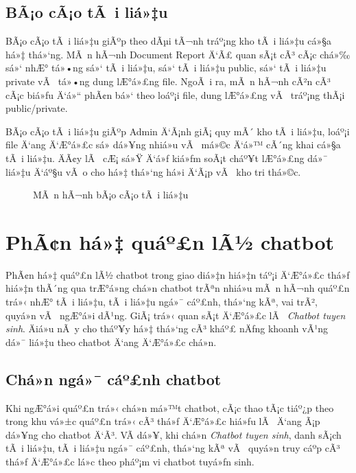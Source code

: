 ﻿\documentclass[12pt,a4paper]{report}
\begin{document}
\subsection{BÃ¡o cÃ¡o tÃ i liá»‡u}

BÃ¡o cÃ¡o tÃ i liá»‡u giÃºp theo dÃµi tÃ¬nh tráº¡ng kho tÃ i liá»‡u cá»§a há»‡ thá»‘ng. MÃ n hÃ¬nh Document Report Ä‘Ã£ quan sÃ¡t cÃ³ cÃ¡c chá»‰ sá»‘ nhÆ° tá»•ng sá»‘ tÃ i liá»‡u, sá»‘ tÃ i liá»‡u public, sá»‘ tÃ i liá»‡u private vÃ  tá»•ng dung lÆ°á»£ng file. NgoÃ i ra, mÃ n hÃ¬nh cÃ²n cÃ³ cÃ¡c biá»ƒu Ä‘á»“ phÃ¢n bá»‘ theo loáº¡i file, dung lÆ°á»£ng vÃ  tráº¡ng thÃ¡i public/private.

BÃ¡o cÃ¡o tÃ i liá»‡u giÃºp Admin Ä‘Ã¡nh giÃ¡ quy mÃ´ kho tÃ i liá»‡u, loáº¡i file Ä‘ang Ä‘Æ°á»£c sá»­ dá»¥ng nhiá»u vÃ  má»©c Ä‘á»™ cÃ´ng khai cá»§a tÃ i liá»‡u. ÄÃ¢y lÃ  cÆ¡ sá»Ÿ Ä‘á»ƒ kiá»ƒm soÃ¡t cháº¥t lÆ°á»£ng dá»¯ liá»‡u Ä‘áº§u vÃ o cho há»‡ thá»‘ng há»i Ä‘Ã¡p vÃ  kho tri thá»©c.

\begin{figure}[H]
    \centering
    \caption{MÃ n hÃ¬nh bÃ¡o cÃ¡o tÃ i liá»‡u}
    \label{fig:statistics-document-report}
\end{figure}

\section{PhÃ¢n há»‡ quáº£n lÃ½ chatbot}

PhÃ¢n há»‡ quáº£n lÃ½ chatbot trong giao diá»‡n hiá»‡n táº¡i Ä‘Æ°á»£c thá»ƒ hiá»‡n thÃ´ng qua trÆ°á»ng chá»n chatbot trÃªn nhiá»u mÃ n hÃ¬nh quáº£n trá»‹ nhÆ° tÃ i liá»‡u, tÃ i liá»‡u ngá»¯ cáº£nh, thá»‘ng kÃª, vai trÃ², quyá»n vÃ  ngÆ°á»i dÃ¹ng. GiÃ¡ trá»‹ quan sÃ¡t Ä‘Æ°á»£c lÃ  \textit{Chatbot tuyen sinh}. Äiá»u nÃ y cho tháº¥y há»‡ thá»‘ng cÃ³ kháº£ nÄƒng khoanh vÃ¹ng dá»¯ liá»‡u theo chatbot Ä‘ang Ä‘Æ°á»£c chá»n.

\subsection{Chá»n ngá»¯ cáº£nh chatbot}

Khi ngÆ°á»i quáº£n trá»‹ chá»n má»™t chatbot, cÃ¡c thao tÃ¡c tiáº¿p theo trong khu vá»±c quáº£n trá»‹ cÃ³ thá»ƒ Ä‘Æ°á»£c hiá»ƒu lÃ  Ä‘ang Ã¡p dá»¥ng cho chatbot Ä‘Ã³. VÃ­ dá»¥, khi chá»n \textit{Chatbot tuyen sinh}, danh sÃ¡ch tÃ i liá»‡u, tÃ i liá»‡u ngá»¯ cáº£nh, thá»‘ng kÃª vÃ  quyá»n truy cáº­p cÃ³ thá»ƒ Ä‘Æ°á»£c lá»c theo pháº¡m vi chatbot tuyá»ƒn sinh.
\end{document}

